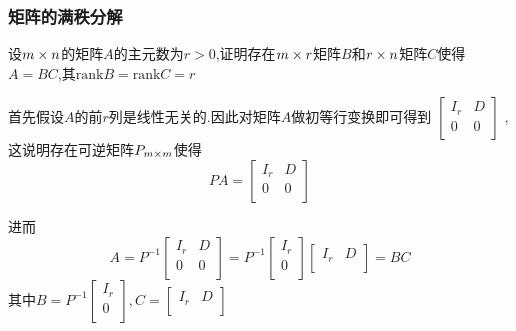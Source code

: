 \documentclass{article}
\newenvironment{cproof}{%
\heiti{证明}\kaishu
}{%
}
\newcommand{\rank}{\text{rank}}
\begin{document}
\begin{CJK}{UTF8}{gkai}
\subsubsection{矩阵的满秩分解}
设$m\times n$的矩阵$A$的主元数为$r > 0$,证明存在$m\times r$矩阵$B$和$r\times n$矩阵$C$使得$A = BC$,其$\rank B = \rank C = r$

\begin{cproof}
首先假设$A$的前$r$列是线性无关的.因此对矩阵$A$做初等行变换即可得到
$\begin{bmatrix}
    I_r & D\\
    0 & 0\\
\end{bmatrix}
$
,这说明存在可逆矩阵$P_{m\times m}$使得
\[PA = 
\begin{bmatrix}
    I_r&D\\
    0&0\\
\end{bmatrix}\]

进而
\[A = P^{-1}\begin{bmatrix}
    I_r & D\\
    0& 0\\
\end{bmatrix}
=P^{-1} 
\begin{bmatrix}
    I_r\\
    0\\
\end{bmatrix}
\begin{bmatrix}
    I_r & D\\
\end{bmatrix}
=BC
\]
其中$B = P^{-1} 
\begin{bmatrix}
    I_r\\
    0\\
\end{bmatrix},C = \begin{bmatrix}
    I_r & D\\
\end{bmatrix}$


\end{cproof}
\end{CJK}
\end{document}
